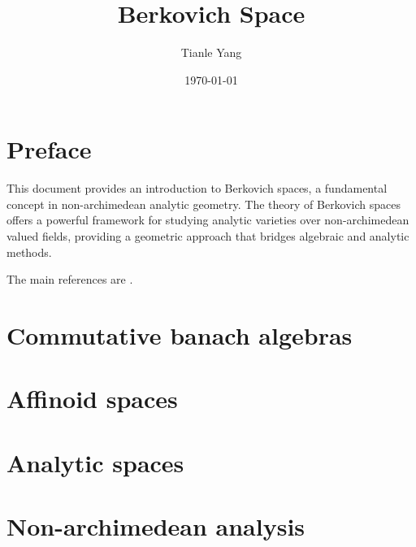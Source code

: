 \documentclass[sectionlevel=book]{noteformyself}
\title{Berkovich Space}
\author{Tianle Yang}
\date{\today}
\begin{document}
   \maketitle

   \tableofcontents %


   \chapter*{Preface}

   This document provides an introduction to Berkovich spaces, a fundamental concept in non-archimedean analytic geometry. 
   The theory of Berkovich spaces offers a powerful framework for studying analytic varieties over non-archimedean valued fields, providing a geometric approach that bridges algebraic and analytic methods.

   The main references are \cite{Ber90,BGR84}.

   \chapter{Commutative banach algebras}
      
      

   \chapter{Affinoid spaces}
      
      

   \chapter{Analytic spaces}

   \appendix

   \chapter{Non-archimedean analysis}
      
      

   \printbibliography[heading=bibintoc, title={References}] %
\end{document}
